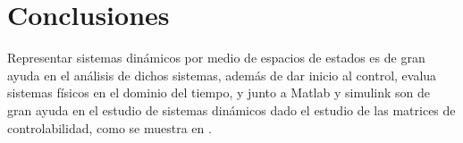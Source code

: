 \documentclass{article}
\begin{document}
\section{Conclusiones}

Representar sistemas dinámicos por medio de espacios de estados es de gran ayuda en el análisis de dichos sistemas, además de dar inicio al control, evalua sistemas físicos en el dominio del tiempo, y junto a Matlab y simulink son de gran ayuda en el estudio de sistemas dinámicos  dado el estudio de las matrices de controlabilidad, como se muestra en \cite{chatterjee2021covid}.

\printbibliography[heading=bibintoc]
\end{document}
